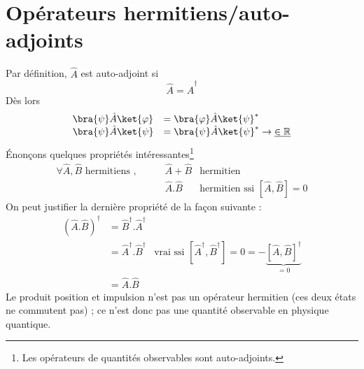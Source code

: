 \section{Opérateurs hermitiens/auto-adjoints}
Par définition, $\hat{A}$ est auto-adjoint si
\begin{equation}
\hat{A} = \hat{A}^\dagger
\end{equation}
Dès lors
\begin{equation}
\begin{array}{ll}
\bra{\psi}\hat{A}\ket{\varphi} &= \bra{\varphi}\hat{A}\ket{\psi}^*\\
\bra{\psi}\hat{A}\ket{\psi} &= \bra{\psi}\hat{A}\ket{\psi}^* \rightarrow \underline{\in \mathbb{R}}
\end{array}
\end{equation}
Énonçons quelques propriétés intéressantes\footnote{Les opérateurs de quantités observables sont
auto-adjoints.}
\begin{equation}
\begin{array}{lll}
\forall \hat{A},\hat{B} \text{ hermitiens },\qquad & \hat{A}+\hat{B} & \text{hermitien}\\
& \hat{A}.\hat{B} & \text{hermitien ssi } [\hat{A},\hat{B}] = 0
\end{array}
\end{equation}
On peut justifier la dernière propriété de la façon suivante :
\begin{equation}
\begin{array}{lll}
(\hat{A}.\hat{B})^\dagger &= \hat{B}^\dagger.\hat{A}^\dagger \\
&= \hat{A}^\dagger.\hat{B}^\dagger & \text{vrai ssi } [\hat{A}^\dagger,\hat{B}^\dagger]=0=-
\underbrace{[\hat{A},\hat{B}]^\dagger}_{=0}\\
&= \hat{A}.\hat{B}
\end{array}
\end{equation}
Le produit position et impulsion n'est pas un opérateur hermitien (ces deux états ne 
commutent pas) ; ce n'est donc pas une quantité observable en physique quantique.\\




